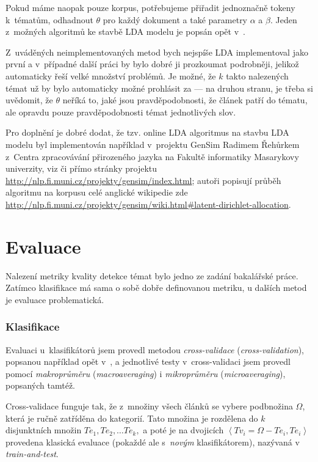 \documentclass[12pt,a4paper]{report}
\begin{document}
Pokud máme naopak pouze korpus, potřebujeme přiřadit jednoznačně tokeny k~tématům, odhadnout $\theta$ pro každý dokument a také parametry $\alpha$ a $\beta$. Jeden z~možných algoritmů ke stavbě LDA modelu je popsán opět v~\cite{lda}.

Z~uváděných neimplementovaných metod bych nejspíše LDA implementoval jako první a v~případné další práci by bylo dobré ji prozkoumat podrobněji, jelikož automaticky řeší velké množství problémů. Je možné, že $k$ takto nalezených témat už by bylo automaticky možné prohlásit za  --- na druhou stranu, je třeba si uvědomit, že $\theta$ neříká to, jaké jsou pravděpodobnosti, že článek patří do tématu, ale opravdu pouze pravděpodobnosti témat jednotlivých slov.

Pro doplnění je dobré dodat, že tzv. online LDA algoritmus na stavbu LDA modelu byl implementován například v~projektu GenSim Radimem Řehůrkem z~Centra zpracovávání přirozeného jazyka na Fakultě informatiky Masarykovy univerzity, viz \cite{rehurek} či přímo stránky projektu \url{http://nlp.fi.muni.cz/projekty/gensim/index.html}; autoři popisují průběh algoritmu na korpusu celé anglické wikipedie zde \url{http://nlp.fi.muni.cz/projekty/gensim/wiki.html\#latent-dirichlet-allocation}.

\section{Evaluace}
\label{sec:evaluace}
Nalezení metriky kvality detekce témat bylo jedno ze zadání bakalářské práce. Zatímco klasifikace má sama o sobě dobře definovanou metriku, u dalších metod je evaluace problematická.

\subsubsection{Klasifikace}

Evaluaci u~klasifikátorů jsem provedl metodou \emph{cross-validace} (\emph{cross-va\-li\-da\-tion}), popsanou například opět v~\cite{machine_intro}, a jednotlivé testy v~cross-validaci jsem provedl pomocí \emph{makroprůměru} (\emph{macroaveraging}) i \emph{mikroprůměru} (\emph{microaveraging}), popsaných tamtéž.

Cross-validace funguje tak, že z~množiny všech článků se vybere podbnožina $\Omega$, která je ručně zatříděna do kategorií. Tato množina je rozdělena do $k$ disjunktních množin $Te_1, Te_2, \ldots Te_k,$ a poté je na dvojicích $\left<Tv_i=\Omega-Te_{i}, Te_{i}\right>$ provedena klasická evaluace (pokaždé ale s~\emph{novým} klasifikátorem), nazývaná v~\cite{machine_intro} \emph{train-and-test}.
\end{document}
